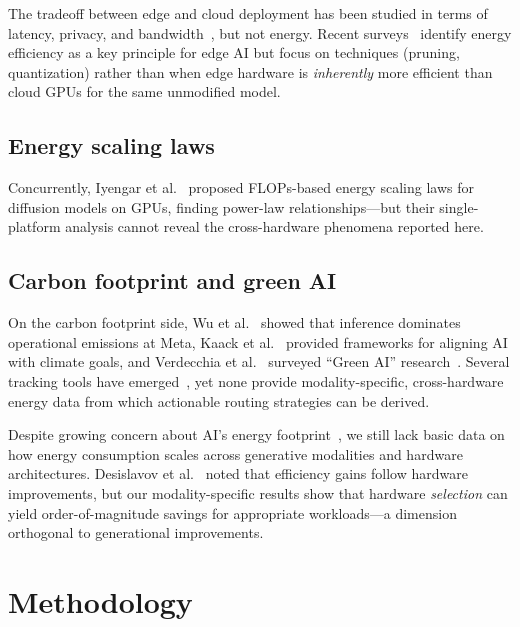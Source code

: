 \documentclass[preprint,12pt]{elsarticle}
\begin{document}
The tradeoff between edge and cloud deployment has been studied in terms of latency, privacy, and bandwidth~\cite{mao2024green,xu2024edge}, but not energy. Recent surveys~\cite{mao2024green} identify energy efficiency as a key principle for edge AI but focus on techniques (pruning, quantization) rather than when edge hardware is \textit{inherently} more efficient than cloud GPUs for the same unmodified model.

\subsection{Energy scaling laws}

Concurrently, Iyengar et al.~\cite{castano2025energy} proposed FLOPs-based energy scaling laws for diffusion models on GPUs, finding power-law relationships---but their single-platform analysis cannot reveal the cross-hardware phenomena reported here.

\subsection{Carbon footprint and green AI}

On the carbon footprint side, Wu et al.~\cite{wu2022sustainable} showed that inference dominates operational emissions at Meta, Kaack et al.~\cite{kaack2022aligning} provided frameworks for aligning AI with climate goals, and Verdecchia et al.~\cite{verdecchia2023systematic} surveyed ``Green AI'' research~\cite{schwartz2020green}. Several tracking tools have emerged~\cite{henderson2020towards,lacoste2019quantifying,anthony2020carbontracker,garcia2019estimation}, yet none provide modality-specific, cross-hardware energy data from which actionable routing strategies can be derived.

Despite growing concern about AI's energy footprint~\cite{verdecchia2023systematic,wu2022sustainable,kaack2022aligning}, we still lack basic data on how energy consumption scales across generative modalities and hardware architectures. Desislavov et al.~\cite{desislavov2023trends} noted that efficiency gains follow hardware improvements, but our modality-specific results show that hardware \textit{selection} can yield order-of-magnitude savings for appropriate workloads---a dimension orthogonal to generational improvements.

\section{Methodology}
\label{sec:methodology}
\end{document}

